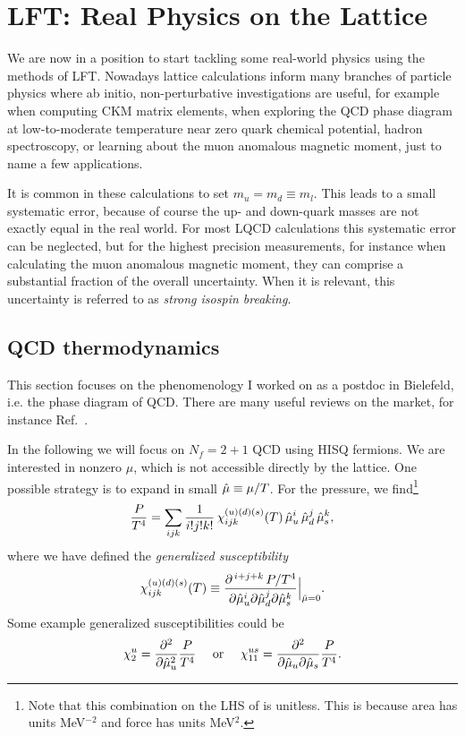 \chapter{LFT: Real Physics on the Lattice}\label{ch:realPhys}

We are now in a position to start tackling some real-world physics using the
methods of LFT. Nowadays lattice calculations inform many branches of particle
physics where ab initio, non-perturbative investigations are useful, for example
when computing CKM matrix elements, when exploring the QCD phase diagram at
low-to-moderate temperature near zero quark chemical potential, hadron
spectroscopy, or learning about the muon anomalous magnetic moment, just to name
a few applications.

It is common in these calculations to set $m_u=m_d\equiv m_l$.
This leads to a small systematic error, because of course the up-
and down-quark masses are not exactly equal in the real world. For most
LQCD calculations this systematic error can be neglected, but for the
highest precision measurements, for instance when calculating
the muon anomalous magnetic moment, they can comprise a substantial fraction of
the overall uncertainty. When it is relevant, this uncertainty
is referred to as {\it strong isospin breaking}.

\section{QCD thermodynamics}\label{sec:QCDtherm} 

This section focuses on the phenomenology I worked on as a postdoc in
Bielefeld, i.e. the phase diagram of QCD. There are many useful reviews
on the market, for instance Ref.~\cite{ding_thermodynamics_2015}.

In the following we will focus on $N_f=2+1$ QCD using HISQ fermions. We are
interested in nonzero $\mu$, which is not accessible directly by the lattice.
One possible strategy is to expand in small $\hat{\mu}\equiv\mu/T$. For the
pressure, we find\footnote{Note that this combination on the LHS of 
 is unitless. This is because area has units
MeV$^{-2}$ and force has units MeV$^2$.}
\begin{equation}\label{eq:pxpac}
\frac{P}{T^4}=\sum_{ijk}\frac{1}{i!j!k!}\,\chi_{ijk}^{(u)(d)(s)}(T)\,
               \hat{\mu}_u^i\,\hat{\mu}_d^j\,\hat{\mu}_s^k,
\end{equation}
where we have defined the {\it generalized
susceptibility}
\begin{equation}
\chi_{ijk}^{(u)(d)(s)}(T)
  \equiv\frac{\partial^{\,i+j+k}\,P/T^4}{\partial\hat{\mu}_u^i\partial\hat{\mu}_d^j
                                       \partial\hat{\mu}_s^k}\Big|_{\hat{\mu}=0}.
\end{equation}
Some example generalized susceptibilities could be
\begin{equation}
  \chi_2^u=\frac{\partial^2}{\partial\hat{\mu}_u^2}\frac{P}{T^4}
  ~~~~\text{or}~~~~
  \chi_{11}^{us}=\frac{\partial^2}{\partial\hat{\mu}_u\partial\hat{\mu}_s}\frac{P}{T^4}.
\end{equation}

